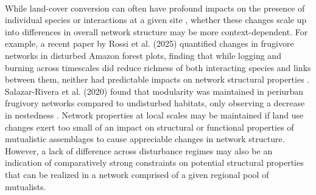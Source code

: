    
    \paragraph{}
    While land-cover conversion can often have profound impacts on the presence of individual species or interactions at a given site \parencite{theodorou2017structure, schneiberg2020urbanization, maurer2024landscape, birkenbach2024land}, whether these changes scale up into differences in overall network structure may be more context-dependent. For example, a recent paper by Rossi et al. (2025) quantified changes in frugivore networks in disturbed Amazon forest plots, finding that while logging and burning across timescales did reduce richness of both interacting species and links between them, neither had predictable impacts on network structural properties \parencite{rossi2025anthropogenic}. Salazar-Rivera et al. (2020) found that modularity was maintained in periurban frugivory networks compared to undisturbed habitats, only observing a decrease in nestedness  \parencite{salazar2020frugivory}. Network properties at local scales may be maintained if land use changes exert too small of an impact on structural or functional properties of mutualistic assemblages to cause appreciable changes in network structure. However, a lack of difference across disturbance regimes may also be an indication of comparatively strong constraints on potential structural properties that can be realized in a network comprised of a given regional pool of mutualists. 
    
